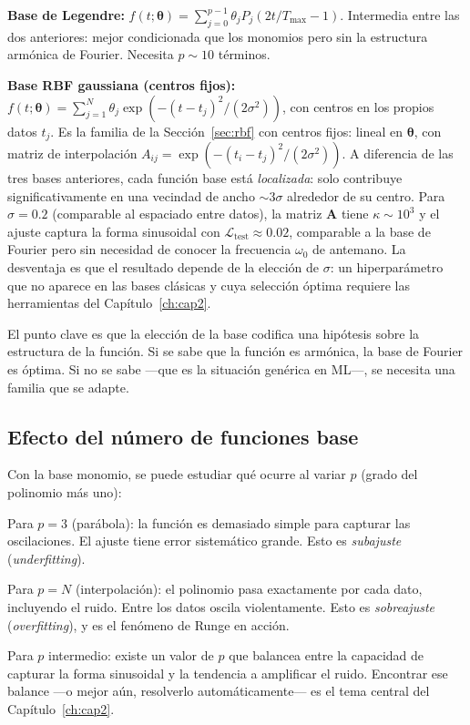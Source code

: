 \textbf{Base de Legendre:} $f(t;\bm{\theta}) = \sum_{j=0}^{p-1}
\theta_j P_j(2t/T_{\max} - 1)$. Intermedia entre las dos anteriores:
mejor condicionada que los monomios pero sin la estructura armónica
de Fourier. Necesita $p \sim 10$ términos.

\textbf{Base RBF gaussiana (centros fijos):} $f(t;\bm{\theta}) =
\sum_{j=1}^N \theta_j\exp(-(t-t_j)^2/(2\sigma^2))$, con centros en
los propios datos $t_j$. Es la familia de la Sección~\ref{sec:rbf}
con centros fijos: lineal en $\bm{\theta}$, con matriz de interpolación
$A_{ij} = \exp(-(t_i-t_j)^2/(2\sigma^2))$. A diferencia de las tres
bases anteriores, cada función base está \emph{localizada}: solo
contribuye significativamente en una vecindad de ancho $\sim 3\sigma$
alrededor de su centro. Para $\sigma = 0.2$ (comparable al espaciado
entre datos), la matriz $\bm{A}$ tiene $\kappa \sim 10^3$ y el ajuste
captura la forma sinusoidal con $\mathcal{L}_{\text{test}} \approx 0.02$,
comparable a la base de Fourier pero sin necesidad de conocer la
frecuencia $\omega_0$ de antemano. La desventaja es que el resultado
depende de la elección de $\sigma$: un hiperparámetro que no aparece en
las bases clásicas y cuya selección óptima requiere las herramientas del
Capítulo~\ref{ch:cap2}.

El punto clave es que la elección de la base codifica una hipótesis
sobre la estructura de la función. Si se sabe que la función es
armónica, la base de Fourier es óptima. Si no se sabe —que es la
situación genérica en ML—, se necesita una familia que se adapte.

\subsection{Efecto del número de funciones base}
\label{subsec:osc_numero_bases}

Con la base monomio, se puede estudiar qué ocurre al variar $p$
(grado del polinomio más uno):

Para $p = 3$ (parábola): la función es demasiado simple para capturar
las oscilaciones. El ajuste tiene error sistemático grande. Esto es
\emph{subajuste} (\textit{underfitting}).

Para $p = N$ (interpolación): el polinomio pasa exactamente por cada
dato, incluyendo el ruido. Entre los datos oscila violentamente. Esto
es \emph{sobreajuste} (\textit{overfitting}), y es el fenómeno de
Runge en acción.

Para $p$ intermedio: existe un valor de $p$ que balancea entre la
capacidad de capturar la forma sinusoidal y la tendencia a amplificar
el ruido. Encontrar ese balance —o mejor aún, resolverlo
automáticamente— es el tema central del Capítulo~\ref{ch:cap2}.

